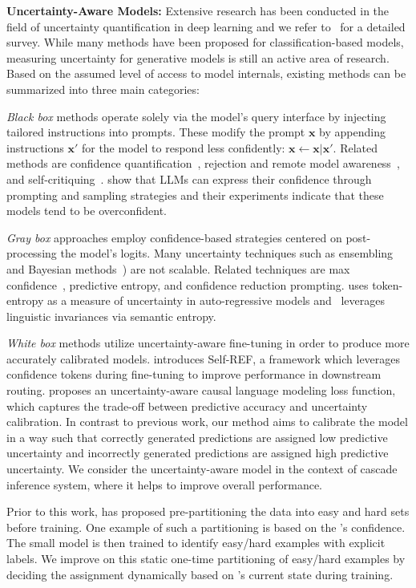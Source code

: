 \textbf{Uncertainty-Aware Models:} Extensive research has been conducted in the field of uncertainty quantification in deep learning and we refer to~\citet{abdar2021review} for a detailed survey. While many methods have been proposed for classification-based models, measuring uncertainty for generative models is still an active area of research.
Based on the assumed level of access to model internals, existing methods can be summarized into three main categories:

\emph{Black box} methods operate solely via the model’s query interface by injecting tailored instructions into prompts. These modify the prompt $\mathbf{x}$ by appending instructions $\mathbf{x}'$ for the model to respond less confidently: $\mathbf{x} \leftarrow \mathbf{x} | \mathbf{x}'$. Related methods are confidence quantification~\citep{shrivastava2023llamas}, rejection and remote model awareness~\citep{kadavath2022language}, and self-critiquing~\citep{gou2023critic}. \citet{xiong2024can} show that LLMs can express their confidence through prompting and sampling strategies and their experiments indicate that these models tend to be overconfident.
 
\emph{Gray box} approaches employ confidence-based strategies centered on post-processing the model’s logits. Many uncertainty techniques such as ensembling~\citep{lakshminarayanan2017simple} and Bayesian methods~\citep{blundell2015weight}) are not scalable. Related techniques are  max confidence~\citep{hendrycks2016baseline}, predictive entropy, and confidence reduction prompting. \citet{malinin2021uncertainty} uses token-entropy as a measure of uncertainty in auto-regressive models and~\citet{kuhn2023semantic} leverages linguistic invariances via semantic entropy.
 
\emph{White box} methods utilize uncertainty-aware fine-tuning in order to produce more accurately calibrated models. \citet{chuang2024learningrouteconfidencetokens} introduces Self-REF, a framework which leverages confidence tokens during fine-tuning to improve performance in downstream routing. \citet{krishnan2024enhancingtrustlargelanguage} proposes an uncertainty-aware causal language modeling loss function, which captures the trade-off between predictive accuracy and uncertainty calibration. In contrast to previous work, our method aims to calibrate the model in a way such that correctly generated predictions are assigned low predictive uncertainty and incorrectly generated predictions are assigned high predictive uncertainty. We consider the uncertainty-aware model in the context of cascade inference system, where it helps to improve overall performance.

Prior to this work, \citet{rawat2021doubtsummontitansefficient} has proposed pre-partitioning the data into easy and hard sets before training. One example of such a partitioning is based on the \bigmodel's confidence. The small model \smallmodel is then trained to identify easy/hard examples with explicit labels. We improve on this static one-time partitioning of easy/hard examples by deciding the assignment dynamically based on \smallmodel's current state during training. 
